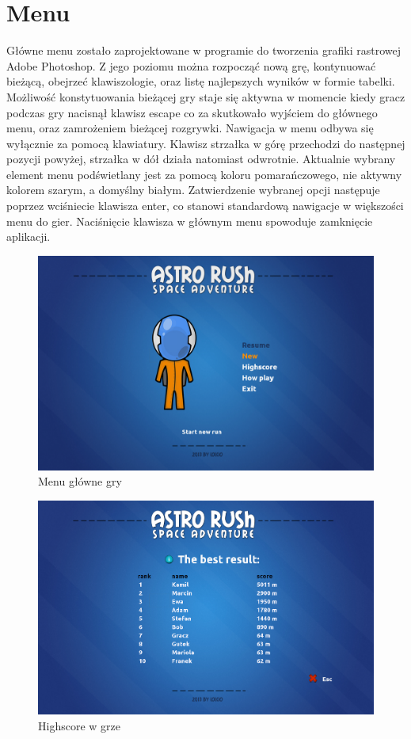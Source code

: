 \section{Menu}
Główne menu zostało zaprojektowane w programie do tworzenia grafiki rastrowej Adobe Photoshop. Z jego poziomu można rozpocząć nową grę, kontynuować bieżącą, obejrzeć klawiszologie, oraz listę najlepszych wyników w formie tabelki. Możliwość konstytuowania bieżącej gry staje się aktywna w momencie kiedy gracz podczas gry nacisnął klawisz escape co za skutkowało wyjściem do głównego menu, oraz zamrożeniem bieżącej rozgrywki. Nawigacja w menu odbywa się wyłącznie za pomocą klawiatury. Klawisz strzałka w górę przechodzi do następnej pozycji powyżej, strzałka w dół działa natomiast odwrotnie. Aktualnie wybrany element menu podświetlany jest za pomocą koloru pomarańczowego, nie aktywny kolorem szarym, a domyślny białym. Zatwierdzenie wybranej opcji następuje poprzez wciśniecie klawisza enter, co stanowi standardową nawigacje w większości menu do gier. Naciśnięcie klawisza w głównym menu spowoduje zamknięcie aplikacji. 

\begin{figure}[h]
    \centering
    \includegraphics[width=429px]{./Pictures/menu1.png}
    \caption{Menu główne gry}
\end{figure}

\newpage 

\begin{figure}[h]
    \centering
    \includegraphics[width=429px]{./Pictures/menu2.png}
    \caption{Highscore w grze}
\end{figure}


